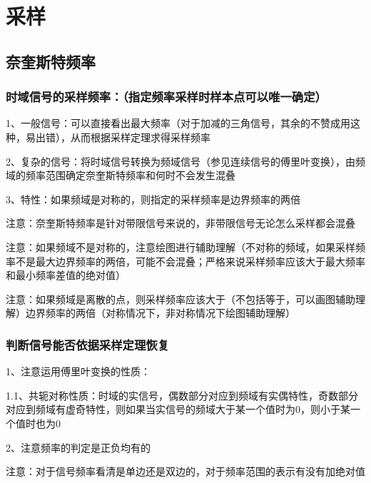\chapter{采样}

\section{奈奎斯特频率}



\subsection{时域信号的采样频率：（指定频率采样时样本点可以唯一确定）}

1、一般信号：可以直接看出最大频率（对于加减的三角信号，其余的不赞成用这种，易出错），从而根据采样定理求得采样频率

2、复杂的信号：将时域信号转换为频域信号（参见连续信号的傅里叶变换），由频域的频率范围确定奈奎斯特频率和何时不会发生混叠

3、特性：如果频域是对称的，则指定的采样频率是边界频率的两倍

注意：奈奎斯特频率是针对带限信号来说的，非带限信号无论怎么采样都会混叠

注意：如果频域不是对称的，注意绘图进行辅助理解（不对称的频域，如果采样频率不是最大边界频率的两倍，可能不会混叠；严格来说采样频率应该大于最大频率和最小频率差值的绝对值）

注意：如果频域是离散的点，则采样频率应该大于（不包括等于，可以画图辅助理解）边界频率的两倍（对称情况下，非对称情况下绘图辅助理解）



\subsection{判断信号能否依据采样定理恢复}

1、注意运用傅里叶变换的性质：

1.1、共轭对称性质：时域的实信号，偶数部分对应到频域有实偶特性，奇数部分对应到频域有虚奇特性，则如果当实信号的频域大于某一个值时为0，则小于某一个值时也为0

2、注意频率的判定是正负均有的



注意：对于信号频率看清是单边还是双边的，对于频率范围的表示有没有加绝对值

